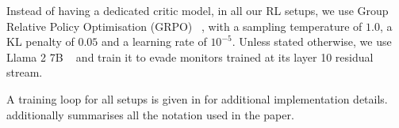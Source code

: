 Instead of having a dedicated critic model, in all our RL setups, we use Group Relative Policy Optimisation (GRPO) ~\citep{shao2024deepseekmath}, with a sampling temperature of $1.0$, a KL penalty of $0.05$ and a learning rate of $10^{-5}$. Unless stated otherwise, we use Llama 2 7B ~\citep{touvron2023llama} and train it to evade monitors trained at its layer 10 residual stream.

A training loop for all setups is given in  for additional implementation details.  additionally summarises all the notation used in the paper.